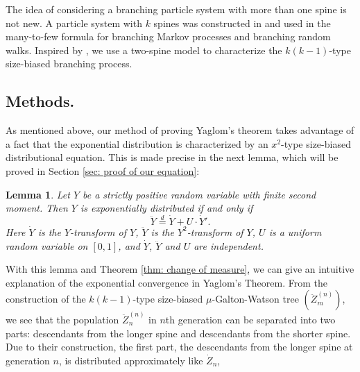 \documentclass[12pt,a4paper]{amsart}
\newtheorem{lem}[thm]{Lemma}
\numberwithin{equation}{section}
\begin{document}
	The idea of considering a branching particle system with more than one spine is not new.
	A particle system with $k$ spines  was constructed in \cite{harris2015many} and used in the  many-to-few formula for branching Markov processes and branching random walks. 
	Inspired by \cite{harris2015many}, we use a two-spine model to characterize the $k(k-1)$-type size-biased branching process.


\subsection{Methods.} 
As mentioned above,
	our method of proving Yaglom's theorem takes advantage of a fact that the exponential distribution is characterized by an $x^2$-type size-biased distributional equation. 
	This is made precise in the next lemma, which will be proved in Section \ref{sec: proof of our equation}:
\begin{lem} \label{lem: our equation}
	Let $Y$ be a strictly positive random variable with finite second moment. 
	Then $Y$ is exponentially distributed if and only if 
\begin{equation} 
\label{eq: x2 type size-biased equation for exponential distribution}
	\ddot Y \overset{d}
	= \dot Y + U \cdot \dot Y'.
\end{equation}
Here $\dot Y$ is the $Y$-transform of  $Y$, $\ddot Y$ is the $Y^2$-transform of $Y$,
$U$ is a uniform random variable on $[0,1]$, and $\dot Y$, $\ddot Y$ and $U$ are independent.
\end{lem}	
	With this lemma and Theorem \ref{thm: change of measure}, we can give an intuitive explanation of the exponential convergence in Yaglom's Theorem.
	From the construction of the $k(k-1)$-type size-biased $\mu$-Galton-Watson tree $(\ddot Z^{(n)}_m)$, we see that 
the population $\ddot Z^{(n)}_n$ in $n$th generation can be separated into two parts:
descendants from the longer spine and descendants from the shorter spine. 
	Due to their construction, 
	the first part, 
the descendants from the longer spine at generation $n$, 
	is distributed approximately like $\dot Z_n$, 
\end{document}
